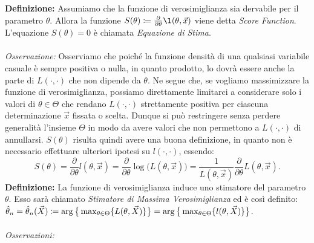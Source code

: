 \\  \\
\textbf{Definizione:} Assumiamo che la funzione di verosimiglianza sia dervabile per il parametro $\theta$. Allora la funzione $S(\theta)\coloneqq \frac{\partial}{\partial \theta}\l(\theta, \vec{x})$ viene detta \textit{Score Function}. L'equazione $S(\theta)=0$ è chiamata \textit{Equazione di Stima}. 
\\
\\
\textit{Osservazione:} Osserviamo che poiché la funzione densità di una qualsiasi variabile casuale è sempre positiva o nulla, in quanto prodotto, lo dovrà essere anche la parte di $L(\cdot,\cdot)$ che non dipende da $\theta$. Ne segue che, se vogliamo massimizzare la funzione di verosimiglianza, possiamo direttamente limitarci a considerare solo i valori di $\theta\in \Theta$ che rendano $L(\cdot,\cdot)$ strettamente positiva per ciascuna determinazione $\vec{x}$ fissata o scelta. Dunque si può restringere senza perdere generalità l'insieme $\Theta$ in modo da avere valori che non permettono a $L(\cdot,\cdot)$ di annullarsi. $S(\theta)$ risulta quindi avere una buona definizione, in quanto non è necessario effettuare ulteriori ipotesi su $l(\cdot,\cdot)$, essendo:  
$$S(\theta)=\frac{\partial}{\partial\theta}l(\theta,\vec{x})=\frac{\partial}{\partial\theta}\log\big(L(\theta,\vec{x})\big)=\frac{1}{L(\theta,\vec{x})}\frac{\partial}{\partial\theta}L(\theta,\vec{x}).$$
\textbf{Definizione:} La funzione di verosimiglianza induce uno stimatore del parametro $\theta$. Esso sarà chiamato \textit{Stimatore di Massima Verosimiglianza} ed è così definito: $\hat{\theta}_n=\hat{\theta}_n(\vec{X})\coloneqq \operatorname{arg}\big\{\max_{\theta\in \Theta}\{L(\theta,\vec{X})\}\big\}=\operatorname{arg}\big\{\max_{\theta\in \Theta}\{l(\theta,\vec{X})\}\big\}$.
\\
\\
\textit{Osservazioni:}
